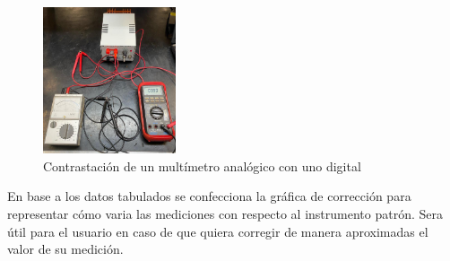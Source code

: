 \begin{table}[H]
    \centering
        \def\tablename{Tabla} 
        \caption{Mediciones del instrumento patrón y el mayor error absoluto}
        \label{tab:exp1a}
\end{table}

\begin{figure}[h!]
        \centering        
        \includegraphics[width=0.35\textwidth]{Imagenes/Exp2.jpeg}
        \caption{Contrastación de un multímetro analógico con uno digital}
        \label{fig:contrast}
\end{figure}

\clearpage
 En base a los datos tabulados se confecciona la gráfica de corrección para representar cómo varia las mediciones con respecto al instrumento patrón. Sera útil para el usuario en caso de que quiera corregir de manera aproximadas el valor de su medición.


